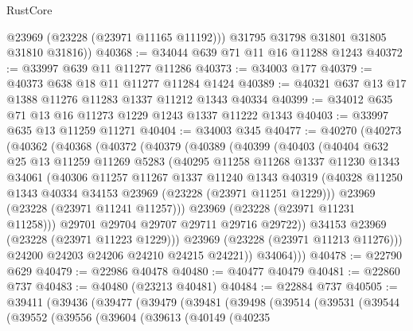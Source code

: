 \begin{lexlean}{RustCore}
\begin{coremodule}
          @23969
          (@23228 (@23971 @11165 @11192)))
        @31795
        @31798
        @31801
        @31805
        @31810
        @31816))
@40368 := @34044 @639 @71 @11 @16 @11288 @1243
@40372 := @33997 @639 @11 @11277 @11286
@40373 := @34003 @177
@40379 := @40373 @638 @18 @11 @11277 @11284 @1424
@40389 := @40321 @637 @13 @17 @1388 @11276 @11283 @1337 @11212 @1343 @40334
@40399 := @34012 @635 @71 @13 @16 @11273 @1229 @1243 @1337 @11222 @1343
@40403 := @33997 @635 @13 @11259 @11271
@40404 := @34003 @345
@40477 := @40270
    (@40273
      (@40362
        (@40368
          (@40372
            (@40379
              (@40389
                (@40399
                  (@40403
                    (@40404
                      @632
                      @25
                      @13
                      @11259
                      @11269
                      @5283
                      (@40295
                        @11258
                        @11268
                        @1337
                        @11230
                        @1343
                        @34061
                        (@40306
                          @11257
                          @11267
                          @1337
                          @11240
                          @1343
                          @40319
                          (@40328 @11250 @1343 @40334 @34153 @23969 (@23228 (@23971 @11251 @1229)))
                          @23969
                          (@23228 (@23971 @11241 @11257)))
                        @23969
                        (@23228 (@23971 @11231 @11258)))
                      @29701
                      @29704
                      @29707
                      @29711
                      @29716
                      @29722))
                  @34153
                  @23969
                  (@23228 (@23971 @11223 @1229)))
                @23969
                (@23228 (@23971 @11213 @11276)))
              @24200
              @24203
              @24206
              @24210
              @24215
              @24221))
          @34064)))
@40478 := @22790 @629
@40479 := @22986 @40478
@40480 := @40477 @40479
@40481 := @22860 @737
@40483 := @40480 (@23213 @40481)
@40484 := @22884 @737
@40505 := @39411
    (@39436
      (@39477
        (@39479
          (@39481
            (@39498
              (@39514
                (@39531
                  (@39544
                    (@39552
                      (@39556
                        (@39604
                          (@39613
                            (@40149
                              (@40235

\end{coremodule}
\end{lexlean}
